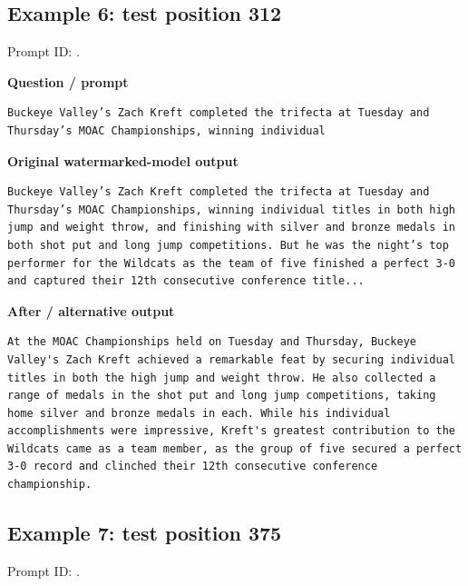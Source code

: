 \subsection{Example 6: test position
312}\label{record-docs-watermarking-qualitative-paper-kgw-vanilla-md-example-6-test-position-312}

Prompt ID:
\texttt{}.

\textbf{Question / prompt}

\begin{Verbatim}
Buckeye Valley’s Zach Kreft completed the trifecta at Tuesday and Thursday’s MOAC Championships, winning individual
\end{Verbatim}

\textbf{Original watermarked-model output}

\begin{Verbatim}
Buckeye Valley’s Zach Kreft completed the trifecta at Tuesday and Thursday’s MOAC Championships, winning individual titles in both high jump and weight throw, and finishing with silver and bronze medals in both shot put and long jump competitions. But he was the night’s top performer for the Wildcats as the team of five finished a perfect 3-0 and captured their 12th consecutive conference title...
\end{Verbatim}

\textbf{After / alternative output}

\begin{Verbatim}
At the MOAC Championships held on Tuesday and Thursday, Buckeye Valley's Zach Kreft achieved a remarkable feat by securing individual titles in both the high jump and weight throw. He also collected a range of medals in the shot put and long jump competitions, taking home silver and bronze medals in each. While his individual accomplishments were impressive, Kreft's greatest contribution to the Wildcats came as a team member, as the group of five secured a perfect 3-0 record and clinched their 12th consecutive conference championship.
\end{Verbatim}

\subsection{Example 7: test position
375}\label{record-docs-watermarking-qualitative-paper-kgw-vanilla-md-example-7-test-position-375}

Prompt ID:
\texttt{}.

